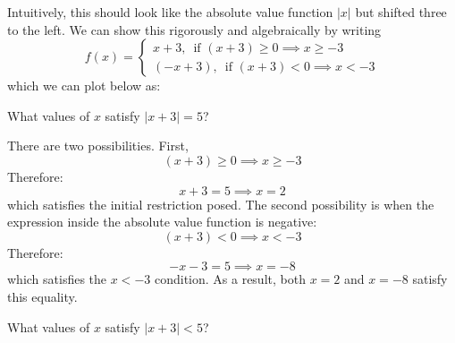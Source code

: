 \begin{itemize}
\begin{example}
        Intuitively, this should look like the absolute value function $|x|$ but shifted three to the left. We can show this rigorously and algebraically by writing
        \begin{equation}
            f(x)=\begin{cases}
                x+3,\, \text{ if }(x+3)\ge 0 \implies x \ge -3 \\ 
                (-x+3),\, \text{ if }(x+3)<0 \implies x<-3
            \end{cases}
            \label{eq:}
        \end{equation}
        which we can plot below as:
        \begin{center}
        \end{center}
    \end{example}
    \begin{example}
        What values of $x$ satisfy $|x+3|=5$?
        \vspace{2mm}

        There are two possibilities. First,
        \begin{equation}
            (x+3) \ge 0 \implies x \ge -3
            \label{eq:}
        \end{equation}
        Therefore:
        \begin{equation}
            x+3=5 \implies x=2
            \label{eq:}
        \end{equation}
        which satisfies the initial restriction posed. The second possibility is when the expression inside the absolute value function is negative: 
        \begin{equation}
            (x+3) < 0 \implies x < -3
            \label{eq:}
        \end{equation}
        Therefore:
        \begin{equation}
            -x-3=5 \implies x=-8
            \label{eq:}
        \end{equation}
        which satisfies the $x<-3$ condition. As a result, both $x=2$ and $x=-8$ satisfy this equality. 
    \end{example}
    \begin{example}
        What values of $x$ satisfy $|x+3|<5$?
        \vspace{2mm}


\end{example}
\end{itemize}
